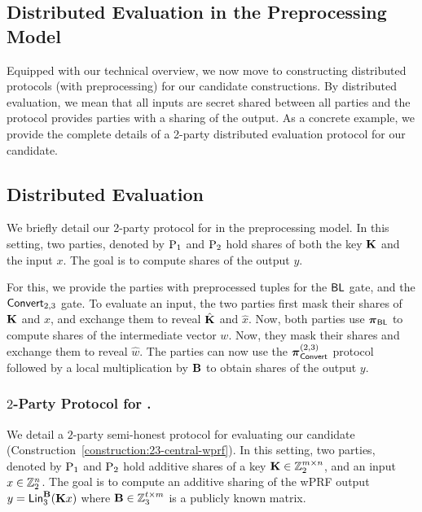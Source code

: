 \iffull
\subsection{Distributed Evaluation in the Preprocessing Model}
\label{subsec:distributed_protocol}
Equipped with our technical overview, we now move to constructing distributed protocols (with preprocessing) for our candidate constructions. By distributed evaluation, we mean that all inputs are secret shared between all parties and the protocol provides parties with a sharing of the output. As a concrete example, we provide the complete details of a 2-party distributed evaluation protocol for our \ttwPRF candidate.
\else
\subsection{Distributed Evaluation}
\label{subsec:distributed_protocol}
\label{subsec:2pc-wprf}
We briefly detail our 2-party protocol for \ttwPRF in the preprocessing model. In this setting, two parties, denoted by $\textnormal{P}_1$ and $\textnormal{P}_2$ hold shares of both the key $\mat{K}$ and the input $x$. The goal is to compute shares of the output $y$.

For this, we provide the parties with preprocessed tuples for the $\textnormal{\textsf{BL}}$ gate, and the $\textnormal{\textsf{Convert}}_{2,3}$ gate. To evaluate an input, the two parties first mask their shares of $\mat{K}$ and $x$, and exchange them to reveal $\hat{\mat{K}}$ and $\hat{x}$. Now, both parties use $\boldsymbol{\pi}_{\textnormal{\textsf{BL}}}$ to compute shares of the intermediate vector $w$. Now, they mask their shares and exchange them to reveal $\hat{w}$. The parties can now use the $\boldsymbol{\pi}_{\textnormal{\textsf{Convert}}}^{(2,3)}$ protocol followed by a local multiplication by $\mat{B}$ to obtain shares of the output $y$.
\fi



\iffull
\subsubsection{$2$-Party Protocol for \ttwPRF.}
\label{subsec:2pc-wprf}
We detail a $2$-party semi-honest protocol for evaluating our \ttwPRF candidate (Construction~\ref{construction:23-central-wprf}). In this setting, two parties, denoted by $\textnormal{P}_1$ and $\textnormal{P}_2$ hold additive shares of a key $\mat{K} \in \Z_2^{m \times n}$, and an input $x \in \mathbb{Z}_2^n$. The goal is to compute an additive sharing of the wPRF output $y = \LMap^\mat{B}_3(\mat{K}x)$ where $\mat{B} \in \Z_3^{t \times m}$ is a publicly known matrix.


